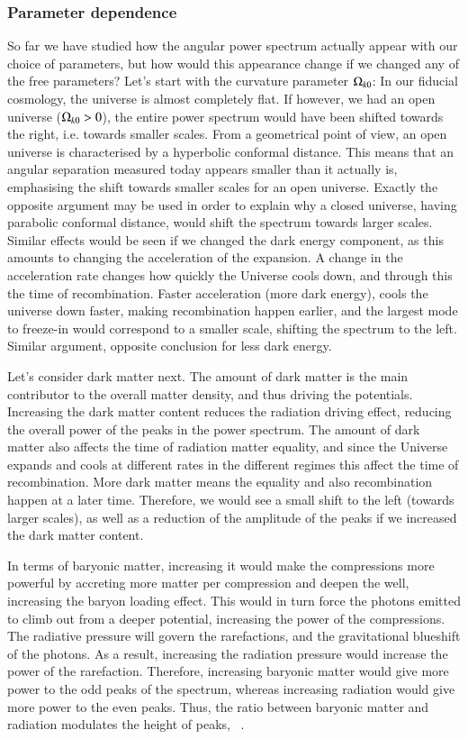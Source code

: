     \subsubsection{Parameter dependence}
        So far we have studied how the angular power spectrum actually appear with our choice of parameters, but how would this appearance change if we changed any of the free parameters? Let's start with the curvature parameter $\Omega_{k0}$: In our fiducial cosmology, the universe is almost completely flat. If however, we had an open universe ($\Omega_{k0}>0$), the entire power spectrum would have been shifted towards the right, i.e. towards smaller scales. From a geometrical point of view, an open universe is characterised by a hyperbolic conformal distance. This means that an angular separation measured today appears smaller than it actually is, emphasising the shift towards smaller scales for an open universe. Exactly the opposite argument may be used in order to explain why a closed universe, having parabolic conformal distance, would shift the spectrum towards larger scales. Similar effects would be seen if we changed the dark energy component, as this amounts to changing the acceleration of the expansion. A change in the acceleration rate changes how quickly the Universe cools down, and through this the time of recombination. Faster acceleration (more dark energy), cools the universe down faster, making recombination happen earlier, and the largest mode to freeze-in would correspond to a smaller scale, shifting the spectrum to the left. Similar argument, opposite conclusion for less dark energy. 

        Let's consider dark matter next. The amount of dark matter is the main contributor to the overall matter density, and thus driving the potentials. Increasing the dark matter content reduces the radiation driving effect, reducing the overall power of the peaks in the power spectrum. The amount of dark matter also affects the time of radiation matter equality, and since the Universe expands and cools at different rates in the different regimes this affect the time of recombination. More dark matter means the equality and also recombination happen at a later time. Therefore, we would see a small shift to the left (towards larger scales), as well as a reduction of the amplitude of the peaks if we increased the dark matter content.   

        In terms of baryonic matter, increasing it would make the compressions more powerful by accreting more matter per compression and deepen the well, increasing the baryon loading effect. This would in turn force the photons emitted to climb out from a deeper potential, increasing the power of the compressions. The radiative pressure will govern the rarefactions, and the gravitational blueshift of the photons. As a result, increasing the radiation pressure would increase the power of the rarefaction. Therefore, increasing baryonic matter would give more power to the odd peaks of the spectrum, whereas increasing radiation would give more power to the even peaks. Thus, the ratio between baryonic matter and radiation modulates the height of peaks, ~\cite{Hu_1996}.

